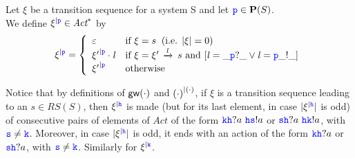 
\begin{definition}
Let $\xi$ be a transition sequence for a system S and let $\ttp\in\roles(S)$.\\
We define $\restrictup{\xi}{\ttp}\in \textit{Act}^*$  by 
$$\restrictup{\xi}{\ttp} = \left\{\begin{array}{ll}
                                                \varepsilon & \text{if } \xi=s  \;\; (\text{i.e. } |\xi|=0) \\
                                               \restrictup{\xi'}{\ttp}\cdot\elle & 
                                                         \text{if } \xi=\xi'\lts{\elle}s \text{ and } [ \elle= \_\ttp?\_  \vee \elle= \ttp\_!\_ ]\\
                                               \restrictup{\xi'}{\ttp}  & \text{otherwise}
                                      \end{array} \right. 
$$
\end{definition}

Notice that by definitions of $\gateway{\cdot}$ and  $\restrictup{(\cdot)}{(\cdot)}$,  
if $\xi$ is a transition sequence leading to an $s\in RS(S)$, then
 $\restrictup{\xi}{\HH}$ is made (but for its last element, in case $|\restrictup{\xi}{\HH}|$ is odd) of consecutive pairs of elements of $\textit{Act}$  of the form
$\KK\HH?a \,\, \HH\tts!a$ or $\tts\HH?a \,\,\HH\KK!a$, with $\tts\neq\KK$.
Moreover, in case $|\restrictup{\xi}{\HH}|$ is odd, it ends with an action of the form
$\KK\HH?a$ or $\tts\HH?a$, with $\tts\neq\KK$.
Similarly for $\restrictup{\xi}{\KK}$.\\

